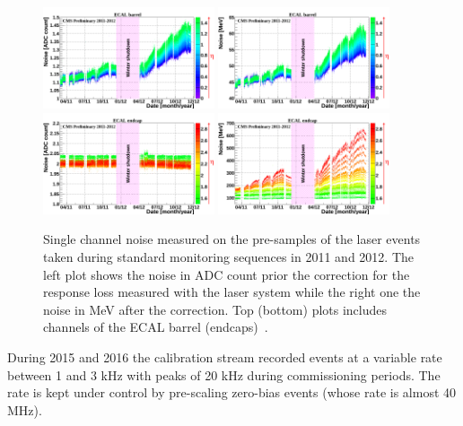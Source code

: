 \begin{figure}[h!]
  \centering
  \includegraphics[width = 0.45\textwidth]{figures/ecal/EB_noise_ADC_counts_2011_2012.png}
  \includegraphics[width = 0.45\textwidth]{figures/ecal/EB_noise_MeV_2011_2012.png} \\
  \includegraphics[width = 0.45\textwidth]{figures/ecal/EE_noise_ADC_counts_2011_2012.png}
  \includegraphics[width = 0.45\textwidth]{figures/ecal/EE_noise_MeV_2011_2012.png}
  \caption{Single channel noise measured on the pre-samples of the laser events taken during
    standard monitoring sequences in 2011 and 2012. The left plot shows the noise in ADC count prior the
    correction for the response loss measured with the laser system while the right one the noise in MeV
    after the correction. Top (bottom) plots includes channels of the ECAL barrel (endcaps)~\cite{ecal_2012}.}
  \label{fig:ecal_noise}
\end{figure}

During 2015 and 2016 the calibration stream recorded events at a variable rate between 1 and 3 kHz with peaks of 20 kHz during
commissioning periods. The rate is kept under control by pre-scaling zero-bias events (whose rate is almost 40 MHz).

